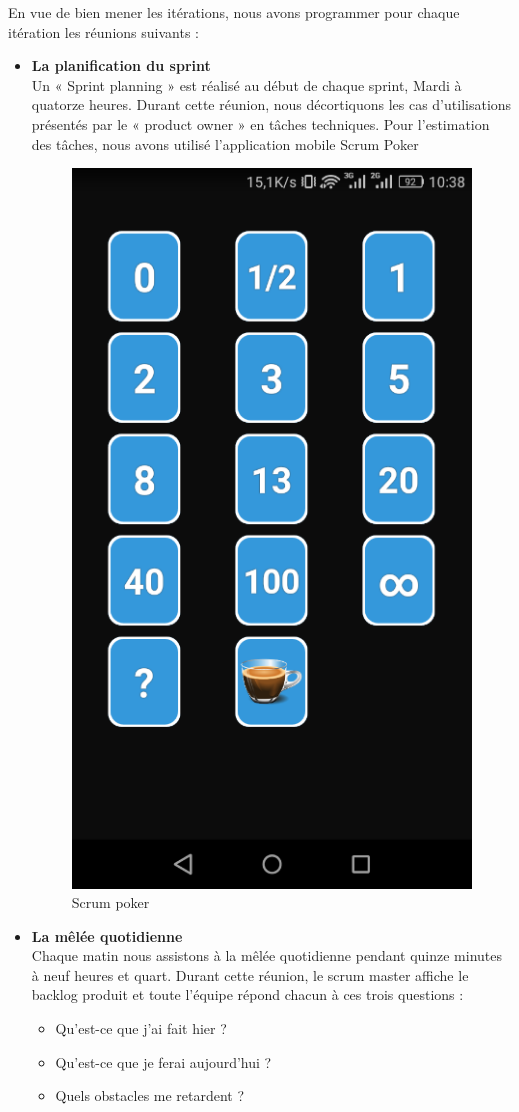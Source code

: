 En vue de bien mener les itérations, nous avons programmer pour chaque itération les réunions suivants :
\begin{itemize}[label=\textbullet,font=\normalsize]
\addtolength{\itemindent}{1cm}
\item \textbf{La planification du sprint }\\
Un « Sprint planning » est réalisé au début de chaque sprint, Mardi à quatorze heures. Durant cette réunion, nous décortiquons les cas d'utilisations présentés par le « product owner » en tâches techniques. Pour l’estimation des tâches, nous avons utilisé l’application mobile Scrum Poker 

\begin{figure}[H]
\centering
\includegraphics[width=0.29\columnwidth]{images/poker.png}
\caption{Scrum poker}
\label{fig:Mod-Enseig}
\end{figure} 

\item \textbf{La mêlée quotidienne}\\
Chaque matin nous assistons à la mêlée quotidienne pendant quinze minutes à neuf heures et quart. Durant cette réunion, le scrum master affiche le backlog produit et toute l’équipe répond chacun à ces trois questions :

\begin{itemize}[font=\normalsize]
\addtolength{\itemindent}{1cm}
\item Qu’est-ce que j’ai fait hier ? 
\item Qu’est-ce que je ferai aujourd’hui ?
\item Quels obstacles me retardent ?


\end{itemize}
\end{itemize}
